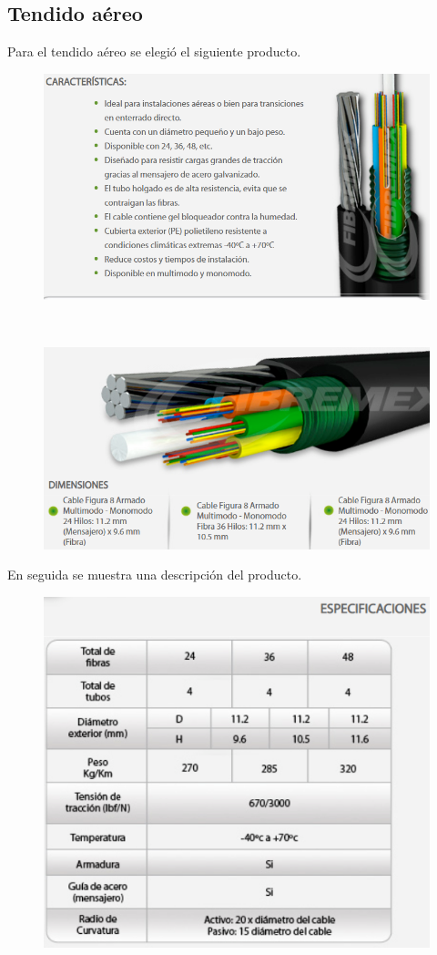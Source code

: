 \documentclass[12pt,letterpaper]{article}
\begin{document}
\subsection{Tendido aéreo}
Para el tendido aéreo se elegió el siguiente producto.
\begin{figure}[ht]
    \centering
    \includegraphics[width=.8\textwidth]{f18.png}
\end{figure}
\\
\begin{figure}[ht]
    \centering
    \includegraphics[width=.8\textwidth]{f20.png}
\end{figure}

\newpage
En seguida se muestra una descripción del producto.
\begin{figure}[ht]
    \centering
    \includegraphics[width=.6\textwidth]{f21.png}
\end{figure}
\end{document}
